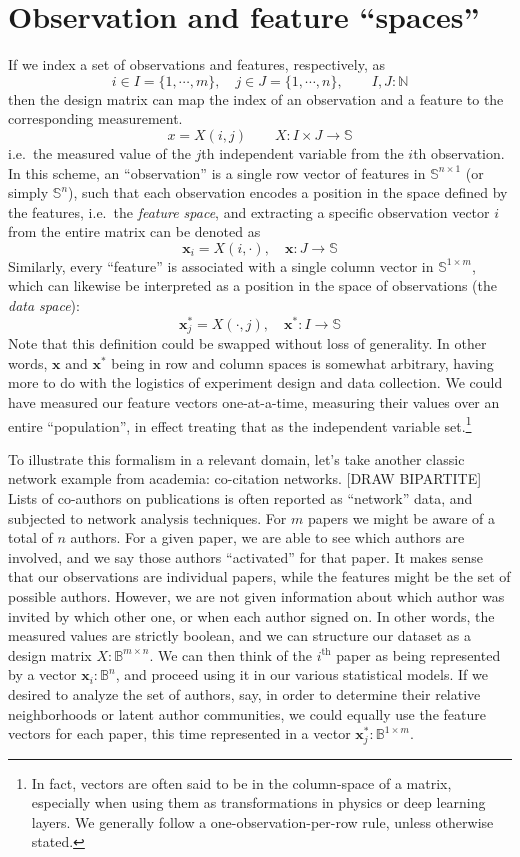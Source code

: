 \documentclass[%
	12pt,
		oneside,
		letterpaper
]{book}
\begin{document}
\section{Observation and feature
``spaces''}\label{observation-and-feature-spaces}

If we index a set of observations and features, respectively, as
\[ i\in I=\{1,\cdots,m\}, \quad j\in J=\{1,\cdots,n\},\qquad I,J:\mathbb{N}\]
then the design matrix can map the index of an observation and a feature
to the corresponding measurement.
\[x=X(i,j)\qquad X : I\times J \rightarrow \mathbb{S}\] i.e.~the
measured value of the \(j\)th independent variable from the \(i\)th
observation. In this scheme, an ``observation'' is a single row vector
of features in \(\mathbb{S}^{n\times 1}\) (or simply
\(\mathbb{S}^{n}\)), such that each observation encodes a position in
the space defined by the features, i.e.~the \emph{feature space}, and
extracting a specific observation vector \(i\) from the entire matrix
can be denoted as
\[\mathbf{x}_i=X(i,\cdot),\quad \mathbf{x}:J\rightarrow\mathbb{S}\]
Similarly, every ``feature'' is associated with a single column vector
in \(\mathbb{S}^{1\times m}\), which can likewise be interpreted as a
position in the space of observations (the \emph{data space}):
\[\mathbf{x}_j^*=X(\cdot,j),\quad \mathbf{x}^*:I\rightarrow\mathbb{S}\]
Note that this definition could be swapped without loss of generality.
In other words, \(\mathbf{x}\) and \(\mathbf{x}^*\) being in row and
column spaces is somewhat arbitrary, having more to do with the
logistics of experiment design and data collection. We could have
measured our feature vectors one-at-a-time, measuring their values over
an entire ``population'', in effect treating that as the independent
variable set.\footnote{ In fact, vectors are often said to be in the
  column-space of a matrix, especially when using them as
  transformations in physics or deep learning layers. We generally
  follow a one-observation-per-row rule, unless otherwise stated.}

To illustrate this formalism in a relevant domain, let's take another
classic network example from academia: co-citation networks. {[}DRAW
BIPARTITE{]} Lists of co-authors on publications is often reported as
``network'' data, and subjected to network analysis techniques. For
\(m\) papers we might be aware of a total of \(n\) authors. For a given
paper, we are able to see which authors are involved, and we say those
authors ``activated'' for that paper. It makes sense that our
observations are individual papers, while the features might be the set
of possible authors. However, we are not given information about which
author was invited by which other one, or when each author signed on. In
other words, the measured values are strictly boolean, and we can
structure our dataset as a design matrix \(X:\mathbb{B}^{m\times n}\).
We can then think of the \(i^{\mathrm{th}}\) paper as being represented
by a vector \(\mathbf{x}_i:\mathbb{B}^n\), and proceed using it in our
various statistical models. If we desired to analyze the set of authors,
say, in order to determine their relative neighborhoods or latent author
communities, we could equally use the feature vectors for each paper,
this time represented in a vector
\(\mathbf{x}^*_j:\mathbb{B}^{1\times m}\).
\end{document}
